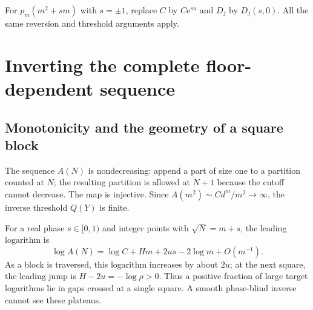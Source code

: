 \documentclass[11pt,a4paper]{article}
\numberwithin{equation}{section}
\theoremstyle{definition}
\theoremstyle{remark}
\newcommand{\e}{\mathrm e}
\begin{document}
For $p_m(m^2+sm)$ with $s=\pm1$, replace $C$ by $C\e^{su}$ and $D_j$ by
$D_j(s,0)$. All the same reversion and threshold arguments apply.

\section{Inverting the complete floor-dependent sequence}
\label{srp:sec:full-inverse}

\subsection{Monotonicity and the geometry of a square block}
The sequence $A(N)$ is nondecreasing: append a part of size one to a
partition counted at $N$; the resulting partition is allowed at $N+1$
because the cutoff cannot decrease. The map is injective. Since
$A(m^2)\sim Cd^m/m^2\to\infty$, the inverse threshold $Q(Y)$ is finite.

For a real phase $s\in[0,1)$ and integer points with $\sqrt N=m+s$, the
leading logarithm is
\begin{equation}
 \log A(N)=\log C+Hm+2us-2\log m+O(m^{-1}).
 \label{srp:eq:log-block}
\end{equation}
As a block is traversed, this logarithm increases by about $2u$; at the
next square, the leading jump is $H-2u=-\log\rho>0$. Thus a positive
fraction of large target logarithms lie in gaps crossed at a single
square. A smooth phase-blind inverse cannot see these plateaus.
\end{document}
